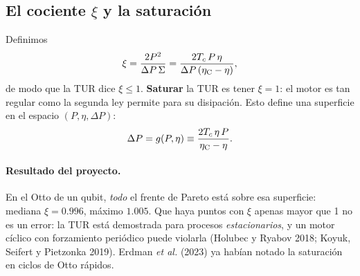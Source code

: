 \subsection{El cociente $\xi$ y la saturación}

Definimos
\begin{equation}
\xi = \frac{2P^2}{\Delta P\,\Sigma} = \frac{2T_c\,P\,\eta}{\Delta P\,(\eta_{\mathrm{C}} - \eta)} ,
\end{equation}
de modo que la TUR dice $\xi \le 1$. \textbf{Saturar} la TUR es tener $\xi = 1$: el motor es tan
regular como la segunda ley permite para su disipación. Esto define una superficie en el espacio
$(P,\eta,\Delta P)$:
\begin{equation}
\Delta P = g(P,\eta) \equiv \frac{2T_c\,\eta\,P}{\eta_{\mathrm{C}} - \eta}.
\label{eq:g}
\end{equation}

\paragraph{Resultado del proyecto.} En el Otto de un qubit, \emph{todo} el frente de Pareto está
sobre esa superficie: mediana $\xi = 0.996$, máximo $1.005$. Que haya puntos con $\xi$ apenas mayor
que 1 no es un error: la TUR está demostrada para procesos \emph{estacionarios}, y un motor cíclico
con forzamiento periódico puede violarla (Holubec y Ryabov 2018; Koyuk, Seifert y Pietzonka 2019).
Erdman \emph{et al.} (2023) ya habían notado la saturación en ciclos de Otto rápidos.
